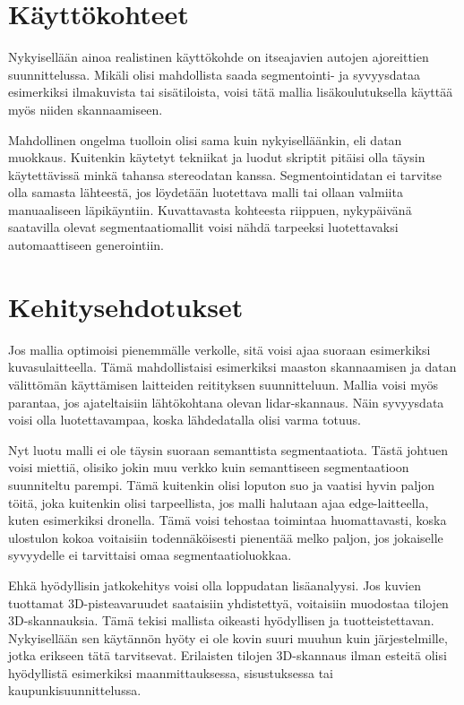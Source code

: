 \section{Käyttökohteet}

Nykyisellään ainoa realistinen käyttökohde on itseajavien autojen ajoreittien suunnittelussa.
Mikäli olisi mahdollista saada segmentointi- ja syvyysdataa esimerkiksi ilmakuvista tai sisätiloista, voisi tätä mallia lisäkoulutuksella käyttää myös niiden skannaamiseen.

Mahdollinen ongelma tuolloin olisi sama kuin nykyiselläänkin, eli datan muokkaus.
Kuitenkin käytetyt tekniikat ja luodut skriptit pitäisi olla täysin käytettävissä minkä tahansa stereodatan kanssa.
Segmentointidatan ei tarvitse olla samasta lähteestä, jos löydetään luotettava malli tai ollaan valmiita manuaaliseen läpikäyntiin.
Kuvattavasta kohteesta riippuen, nykypäivänä saatavilla olevat segmentaatiomallit voisi nähdä tarpeeksi luotettavaksi automaattiseen generointiin.

\section{Kehitysehdotukset}

Jos mallia optimoisi pienemmälle verkolle, sitä voisi ajaa suoraan esimerkiksi kuvasulaitteella.
Tämä mahdollistaisi esimerkiksi maaston skannaamisen ja datan välittömän käyttämisen laitteiden reitityksen suunnitteluun.
Mallia voisi myös parantaa, jos ajateltaisiin lähtökohtana olevan lidar-skannaus.
Näin syvyysdata voisi olla luotettavampaa, koska lähdedatalla olisi varma totuus. 

Nyt luotu malli ei ole täysin suoraan semanttista segmentaatiota.
Tästä johtuen voisi miettiä, olisiko jokin muu verkko kuin semanttiseen segmentaatioon suunniteltu parempi.
Tämä kuitenkin olisi loputon suo ja vaatisi hyvin paljon töitä,
joka kuitenkin olisi tarpeellista, jos malli halutaan ajaa edge-laitteella, kuten esimerkiksi dronella. 
Tämä voisi tehostaa toimintaa huomattavasti, koska ulostulon kokoa voitaisiin todennäköisesti pienentää melko paljon, jos jokaiselle syvyydelle ei tarvittaisi omaa segmentaatioluokkaa.

Ehkä hyödyllisin jatkokehitys voisi olla loppudatan lisäanalyysi.
Jos kuvien tuottamat 3D-pisteavaruudet saataisiin yhdistettyä, voitaisiin muodostaa tilojen 3D-skannauksia.
Tämä tekisi mallista oikeasti hyödyllisen ja tuotteistettavan.
Nykyisellään sen käytännön hyöty ei ole kovin suuri muuhun kuin järjestelmille, jotka erikseen tätä tarvitsevat.
Erilaisten tilojen 3D-skannaus ilman esteitä olisi hyödyllistä esimerkiksi maanmittauksessa, sisustuksessa tai kaupunkisuunnittelussa.

